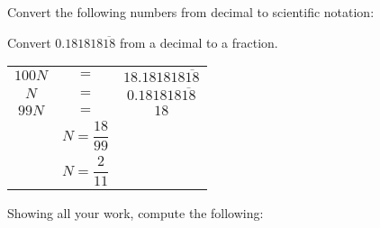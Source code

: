 \documentclass[12pt,letterpaper]{exam}
\begin{document}
\begin{questions}

\vfill

\question[6] Convert the following numbers from decimal to scientific notation: \pspace
{} \vfill





\newpage
\question[6] Convert $0.181818\overline{18}$ from a decimal to a fraction. \pspace

	\begin{table}[!ht]
	\centering\small
	\begin{tabular}{ccc}
	$100N$ & $=$ & $18.181818\overline{18}$ \\[0.3cm] 
	$N$ & $=$ & $0.181818\overline{18}$ \\[0.3cm] \hline
	$99N$ & $=$ & $18$ \\[0.3cm]
	& $N= \dfrac{18}{99}$ & \\[0.3cm]
	& $N= \dfrac{2}{11}$ & 
	\end{tabular}
	\end{table} 





\newpage
\question[6] Showing all your work, compute the following: \pspace
\begin{parts}

\end{parts}
\end{questions}
\end{document}
